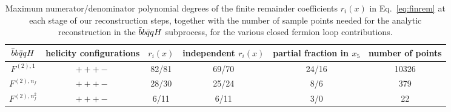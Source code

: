 \documentclass[main.tex]{subfiles}
\begin{document}
\begin{table}[t!]
\centering
\begin{tabularx}{0.95\textwidth}{|C{0.8}|C{1.2}|C{0.8}|C{1.0}|C{1.2}|C{1.0}|}
\hline
 $\bar{b}b\bar{q}qH$     & helicity configurations & $r_i(x)$ & independent $r_i(x)$ & partial fraction in $x_5$ & number of points \\
\hline
$F^{(2),1}$ & $+++-$ & 82/81 & 69/70 & 24/16 & 10326 \\
\hline
$F^{(2),n_f}$ & $+++-$ & 28/30 & 25/24 & 8/6 & 379 \\
\hline
$F^{(2),n_f^2}$ & $+++-$ & 6/11  & 6/11  & 3/0 & 22 \\
\hline
\end{tabularx}
\caption{\label{tab:degrees2q2bH} Maximum numerator/denominator polynomial degrees of the finite remainder coefficients $r_i(x)$ in Eq.~\ref{eq:finrem} 
at each stage of our reconstruction steps, together with the number of sample points needed for the analytic reconstruction in the $\bar{b}b\bar{q}qH$ subprocess, for the various closed fermion loop contributions.}
\end{table}
\end{document}
